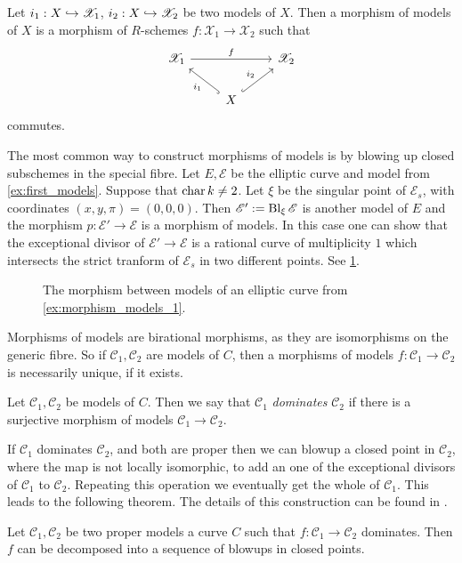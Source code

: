 \begin{definition}
	Let $i_1: X \hookrightarrow \mathscr X_1$, $i_2: X \hookrightarrow \mathscr X_2$ be two models of $X$. 
	Then a morphism of models of $X$ is a morphism of $R$-schemes $f: \mathscr X_1 \to \mathscr X_2$ such that \[
	\begin{tikzcd}
		\mathscr X_1 \ar{rr}{f} & & \mathscr X_2 \\
					& X \ar[hookrightarrow]{ul}{i_1}  \ar[hookrightarrow]{ur}{i_2}
	\end{tikzcd}
	\] 
	commutes.
\end{definition}

\begin{example}\label{ex:morphism_models_1}
	The most common way to construct morphisms of models is by blowing up closed subschemes in the special fibre. 
	Let $E, \mathscr E$ be the elliptic curve and model from \cref{ex:first_models}. 
	Suppose that $\operatorname{char} k \ne 2$. 
	Let $\xi$ be the singular point of $\mathscr E _s$, with coordinates $(x, y,\pi) = (0,0,0)$. 
	Then  $\mathscr E' := \operatorname{Bl}_\xi \mathscr E $ is another model of $E$ and the morphism $p:\mathscr E' \to \mathscr E $ is a morphism of models. 
	In this case one can show that the exceptional divisor of $\mathscr E' \to \mathscr E$ is a rational curve of multiplicity $1$ which intersects the strict tranform of $\mathscr E _s$ in two different points. 
	See \cref{fig:morphism_models_blowup_1}.
\end{example}

\begin{figure}[h]
    \centering
    \caption{The morphism between models of an elliptic curve from \cref{ex:morphism_models_1}.}
    \label{fig:morphism_models_blowup_1}
\end{figure}

Morphisms of models are birational morphisms, as they are isomorphisms on the generic fibre. So if $\mathscr C_1, \mathscr C_2$ are models of $C$, then a morphisms of models $f: \mathscr C_1 \to \mathscr C_2$ is necessarily unique, if it exists. 

\begin{definition}
	Let $\mathscr C_1, \mathscr C_2$ be models of $C$. 
	Then we say that $\mathscr C_1$ \emph{dominates} $\mathscr C_2$ if there is a surjective morphism of models $\mathscr C_1 \to \mathscr C_2$.
\end{definition}

If $\mathscr C_1 $ dominates $\mathscr C_2$, and both are proper then we can blowup a closed point in $\mathscr C_2$, where the map is not locally isomorphic, to add an one of the exceptional divisors of $\mathscr C_1$ to $\mathscr C_2$. 
Repeating this operation we eventually get the whole of $\mathscr C_1$. 
This leads to the following theorem. The details of this construction can be found in \cite[sec.\ 9.1.2]{liuAlgebraicGeometryArithmetic2002}.
\begin{theorem}\label{thm:factorisation_theorem}
	Let $\mathscr C_1, \mathscr C_2$ be two proper models a curve $C$ such that $f: \mathscr C_1 \to \mathscr C_2$ dominates. 
	Then $f$ can be decomposed into a sequence of blowups in closed points. 
\end{theorem}

